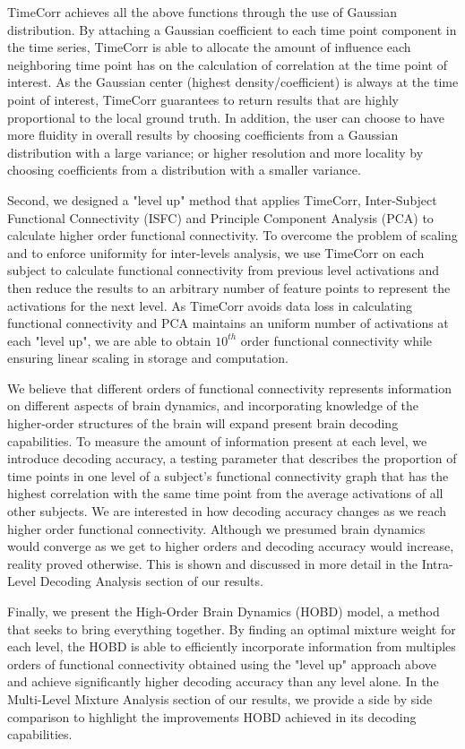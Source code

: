 \documentclass[12pt]{article}
\begin{document}
TimeCorr achieves all the above functions through the use of Gaussian distribution. By attaching a Gaussian coefficient to each time point component in the time series, TimeCorr is able to allocate the amount of influence each neighboring time point has on the calculation of correlation at the time point of interest. As the Gaussian center (highest density/coefficient) is always at the time point of interest, TimeCorr guarantees to return results that are highly proportional to the local ground truth. In addition, the user can choose to have more fluidity in overall results by choosing coefficients from a Gaussian distribution with a large variance; or higher resolution and more locality by choosing coefficients from a distribution with a smaller variance.

Second, we designed a "level up" method that applies TimeCorr, Inter-Subject Functional Connectivity (ISFC) and Principle Component Analysis (PCA) to calculate higher order functional connectivity. To overcome the problem of scaling and to enforce uniformity for inter-levels analysis, we use TimeCorr on each subject to calculate functional connectivity from previous level activations and then reduce the results to an arbitrary number of feature points to represent the activations for the next level. As TimeCorr avoids data loss in calculating functional connectivity and PCA maintains an uniform number of activations at each "level up", we are able to obtain $10^{th}$ order functional connectivity while ensuring linear scaling in storage and computation.

We believe that different orders of functional connectivity represents information on different aspects of brain dynamics, and incorporating knowledge of the higher-order structures of the brain will expand present brain decoding capabilities. To measure the amount of information present at each level, we introduce decoding accuracy, a testing parameter that describes the proportion of time points in one level of a subject's functional connectivity graph that has the highest correlation with the same time point from the average activations of all other subjects. We are interested in how decoding accuracy changes as we reach higher order functional connectivity. Although we presumed brain dynamics would converge as we get to higher orders and decoding accuracy would increase, reality proved otherwise. This is shown and discussed in more detail in the Intra-Level Decoding Analysis section of our results.

Finally, we present the High-Order Brain Dynamics (HOBD) model, a method that seeks to bring everything together. By finding an optimal mixture weight for each level, the HOBD is able to efficiently incorporate information from multiples orders of functional connectivity obtained using the "level up" approach above and achieve significantly higher decoding accuracy than any level alone. In the Multi-Level Mixture Analysis section of our results, we provide a side by side comparison to highlight the improvements HOBD achieved in its decoding capabilities.
\end{document}
